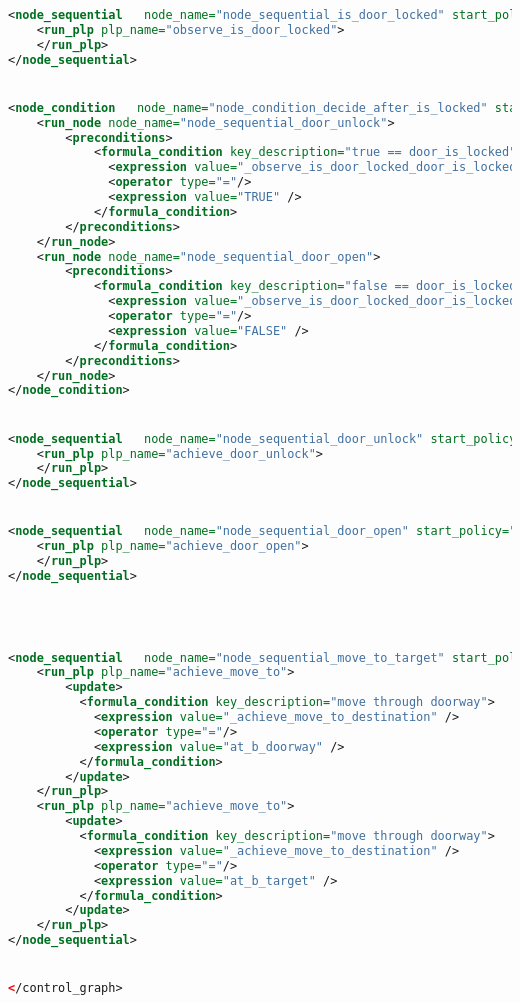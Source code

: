\begin{lstlisting}[style=stylexml,language=XML]
<node_sequential   node_name="node_sequential_is_door_locked" start_policy="any_predecessor_done" next_node_name="node_condition_decide_after_is_locked">
    <run_plp plp_name="observe_is_door_locked">
    </run_plp>
</node_sequential>


<node_condition   node_name="node_condition_decide_after_is_locked" start_policy="any_predecessor_done">
    <run_node node_name="node_sequential_door_unlock">
        <preconditions>
            <formula_condition key_description="true == door_is_locked">
              <expression value="_observe_is_door_locked_door_is_locked" />
              <operator type="="/>
              <expression value="TRUE" />
            </formula_condition>
        </preconditions>
    </run_node>
    <run_node node_name="node_sequential_door_open">
        <preconditions>
            <formula_condition key_description="false == door_is_locked">
              <expression value="_observe_is_door_locked_door_is_locked" />
              <operator type="="/>
              <expression value="FALSE" />
            </formula_condition>
        </preconditions>
    </run_node>
</node_condition>


<node_sequential   node_name="node_sequential_door_unlock" start_policy="any_predecessor_done" next_node_name="node_sequential_door_open">
    <run_plp plp_name="achieve_door_unlock">
    </run_plp>
</node_sequential>


<node_sequential   node_name="node_sequential_door_open" start_policy="any_predecessor_done" next_node_name="node_sequential_move_to_target">
    <run_plp plp_name="achieve_door_open">
    </run_plp>
</node_sequential>




<node_sequential   node_name="node_sequential_move_to_target" start_policy="any_predecessor_done" next_node_name="">
    <run_plp plp_name="achieve_move_to">
        <update>
          <formula_condition key_description="move through doorway">
            <expression value="_achieve_move_to_destination" />
            <operator type="="/>
            <expression value="at_b_doorway" />
          </formula_condition>
        </update>
    </run_plp>
    <run_plp plp_name="achieve_move_to">
        <update>
          <formula_condition key_description="move through doorway">
            <expression value="_achieve_move_to_destination" />
            <operator type="="/>
            <expression value="at_b_target" />
          </formula_condition>
        </update>
    </run_plp>
</node_sequential>


</control_graph>
	\end{lstlisting}
